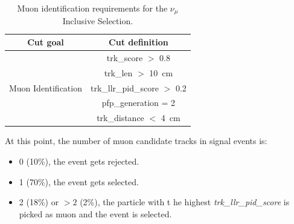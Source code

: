\begin{table}[h!]
\centering
\setlength{\tabcolsep}{10pt}
\renewcommand{\arraystretch}{1.25}
 \begin{tabular}{| c | c |} 
 \hline
 Cut goal & Cut definition \\
 \hline\hline
\multirow{5}{*}{ Muon Identification } & 
trk\_score $>$ 0.8 \\ &
trk\_len $>$ \SI{10}{\cm} \\ &
trk\_llr\_pid\_score $>$ 0.2\\ &
pfp\_generation = 2  \\ &
trk\_distance $<$ \SI{4}{\cm}\\
 \hline
 \end{tabular}
 \caption{\label{tab:1muNp:preseInclusivelMuon} Muon identification requirements for the $\nu_\mu$ Inclusive Selection.}
\end{table}

At this point, the number of muon candidate tracks in signal events is:

\begin{itemize}
    \item 0 (10\%), the event gets rejected.
    \item 1 (70\%), the event gets selected.
    \item 2 (18\%) or $>2$ (2\%), the particle with t   he highest \textit{trk\_llr\_pid\_score} is picked as muon and the event is selected.
\end{itemize}

